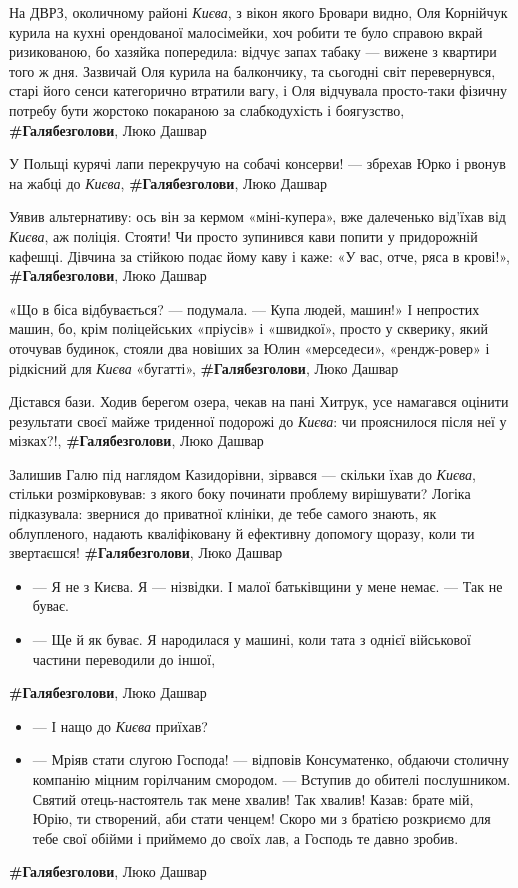На ДВРЗ, околичному районі \emph{Києва}, з вікон якого Бровари видно, Оля Корнійчук
курила на кухні орендованої малосімейки, хоч робити те було справою вкрай
ризикованою, бо хазяйка попередила: відчує запах табаку — вижене з квартири
того ж дня. Зазвичай Оля курила на балкончику, та сьогодні світ перевернувся,
старі його сенси категорично втратили вагу, і Оля відчувала просто-таки фізичну
потребу бути жорстоко покараною за слабкодухість і боягузство,
\textbf{\#Галябезголови}, Люко Дашвар

У Польщі курячі лапи перекручую на собачі консерви! — збрехав Юрко і рвонув на
жабці до \emph{Києва},
\textbf{\#Галябезголови}, Люко Дашвар

Уявив альтернативу: ось він за кермом «міні-купера», вже далеченько від'їхав
від \emph{Києва}, аж поліція. Стояти! Чи просто зупинився кави попити у придорожній
кафешці. Дівчина за стійкою подає йому каву і каже: «У вас, отче, ряса в
крові!»,
\textbf{\#Галябезголови}, Люко Дашвар

«Що в біса відбувається? — подумала. — Купа людей, машин!» І непростих машин,
бо, крім поліцейських «пріусів» і «швидкої», просто у скверику, який оточував
будинок, стояли два новіших за Юлин «мерседеси», «рендж-ровер» і рідкісний для
\emph{Києва} «бугатті»,
\textbf{\#Галябезголови}, Люко Дашвар

Дістався бази. Ходив берегом озера, чекав на пані Хитрук, усе намагався оцінити
результати своєї майже триденної подорожі до \emph{Києва}: чи прояснилося після неї у
мізках?!, 
\textbf{\#Галябезголови}, Люко Дашвар

Залишив Галю під наглядом Казидорівни, зірвався — скільки їхав до \emph{Києва},
стільки розмірковував: з якого боку починати проблему вирішувати? Логіка
підказувала: звернися до приватної клініки, де тебе самого знають, як
облупленого, надають кваліфіковану й ефективну допомогу щоразу, коли ти
звертаєшся!  \textbf{\#Галябезголови}, Люко Дашвар

\begin{itemize}
\item — Я не з Києва. Я — нізвідки. І малої батьківщини у мене немає. — Так не буває.
\item — Ще й як буває. Я народилася у машині, коли тата з однієї
військової частини переводили до іншої,
\end{itemize}
\textbf{\#Галябезголови}, Люко Дашвар

\begin{itemize}
\item — І нащо до \emph{Києва} приїхав?
\item — Мріяв стати слугою Господа! — відповів Консуматенко, обдаючи столичну
				компанію міцним горілчаним смородом. — Вступив до обителі послушником.
				Святий отець-настоятель так мене хвалив! Так хвалив! Казав: брате мій,
				Юрію, ти створений, аби стати ченцем! Скоро ми з братією розкриємо для
				тебе свої обійми і приймемо до своїх лав, а Господь те давно зробив.
\end{itemize}
\textbf{\#Галябезголови}, Люко Дашвар

